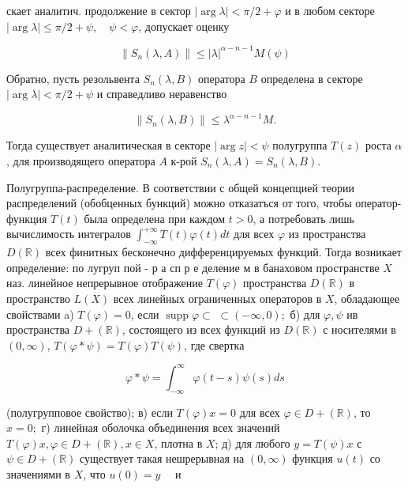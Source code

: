 \documentclass[10pt]{article}
\begin{document}
скает аналитич. продолжение в сектор $|\arg \lambda|<\pi / 2+\varphi$ и в любом секторе $|\arg \lambda| \leqslant \pi / 2+\psi, \quad \psi<\varphi$, допускает оценку



\[

\left\|S_{n}(\lambda, A)\right\| \leqslant|\lambda|^{\alpha-n-1} M(\psi)

\]



Обратно, пусть резольвента $S_{n}(\lambda, B)$ оператора $B$ определена в секторе $|\arg \lambda|<\pi / 2+\psi$ и справедливо неравенство



\[

\left\|S_{n}(\lambda, B)\right\| \leqslant \lambda^{\alpha-n-1} M .

\]



Тогда существует аналитическая в секторе $|\arg z|<\psi$ полугруппа $T(z)$ роста $\alpha$, для производящего оператора $A$ к-рой $S_{n}(\lambda, A)=S_{n}(\lambda, B)$.



Полугруппа-распределение. В соответствии с общей концепцией теории распределений (обобценных бункций) можно отказатъся от того, чтобы оператор-функция $T(t)$ была определена при каждом $t>0$, а потребовать лишь вычислимость интегралов $\int_{-\infty}^{+\infty} T(t) \varphi(t) d t$ для всех $\varphi$ из пространства $D(\mathbb{R})$ всех финитных бесконечно дифференцируемых функций. Тогда возникает определение: по лугруп пой - р а сп р е деление м в банаховом пространстве $X$ наз. линейное непрерывное отображение $T(\varphi)$ пространства $D(\mathbb{R})$ в пространство $L(X)$ всех линейных ограниченных операторов в $X$, обладающее свойствами a) $T(\varphi)=0$, если $\operatorname{supp} \varphi \subset$ $\subset(-\infty, 0) ;$ б) для $\varphi, \psi$ ив пространства $D+(\mathbb{R})$, состоящего из всех функций из $D(\mathbb{R})$ с носителями в $(0, \infty)$, $T(\varphi * \psi)=T(\varphi) T(\psi)$, где свертка



\[

\varphi * \psi=\int_{-\infty}^{\infty} \varphi(t-s) \psi(s) d s

\]



(полугрупповое свойство); в) если $T(\varphi) x=0$ для всех $\varphi \in D+(\mathbb{R})$, то $x=0 ;$ г) линейная оболочка объединения всех значений $T(\varphi) x, \varphi \in D+(\mathbb{R}), x \in X$, плотна в $X$; д) для любого $y=T(\psi) x$ с $\psi \in D+(\mathbb{R})$ существует такая нешрерывная на $(0, \infty)$ функция $u(t)$ со значениями в $X$, что $u(0)=y \quad$ и
\end{document}
